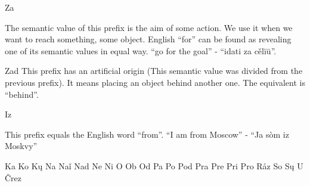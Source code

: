 Za

The semantic value of this prefix is the aim of some action. We use it when we want to reach something, some object. English “for” can be found as revealing one of its semantic values in equal way. “go for the goal” - “idati za cělïü”.

Zad
This prefix has an artificial origin (This semantic value was divided from the previous prefix). It means placing an object behind another one. The equivalent is “behind”.

Iz

This prefix equals the English word “from”. “I am from Moscow” - “Ja sòm iz Moskvy”

Ka
Ko
Kų
Na
Naǐ
Nad
Ne
Ni
O
Ob
Od
Pa
Po
Pod
Pra
Pre
Pri
Pro
Råz
So
Sų
U
Črez
